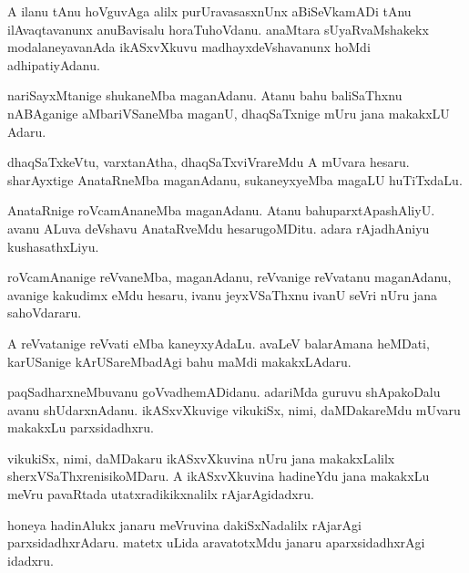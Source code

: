 \documentclass{article}
\begin{document}
\begin{mn}%
A ilanu tAnu hoVguvAga alilx purUravasasxnUnx aBiSeVkamADi tAnu
ilAvaqtavanunx anuBavisalu horaTuhoVdanu. anaMtara sUyaRvaMshakekx
modalaneyavanAda ikASxvXkuvu madhayxdeVshavanunx hoMdi adhipatiyAdanu.
\end{mn}

\begin{mn}%
nariSayxMtanige shukaneMba maganAdanu. Atanu bahu baliSaThxnu
nABAganige aMbariVSaneMba maganU, dhaqSaTxnige mUru jana makakxLU Adaru.
\end{mn}

\begin{mn}
dhaqSaTxkeVtu, varxtanAtha, dhaqSaTxviVrareMdu A mUvara
hesaru. sharAyxtige AnataRneMba maganAdanu, sukaneyxyeMba magaLU huTiTxdaLu.
\end{mn}

\begin{mn}
AnataRnige roVcamAnaneMba maganAdanu. Atanu bahuparxtApashAliyU. avanu
ALuva deVshavu AnataRveMdu hesarugoMDitu. adara rAjadhAniyu kushasathxLiyu.
\end{mn}

\begin{mn}
roVcamAnanige reVvaneMba, maganAdanu, reVvanige reVvatanu maganAdanu,
avanige kakudimx eMdu hesaru, ivanu jeyxVSaThxnu ivanU seVri nUru jana sahoVdararu.
\end{mn}

\begin{mn}%
A reVvatanige reVvati eMba kaneyxyAdaLu. avaLeV balarAmana heMDati,
karUSanige kArUSareMbadAgi bahu maMdi makakxLAdaru.
\end{mn}

\begin{mn}%
paqSadharxneMbuvanu goVvadhemADidanu. adariMda guruvu shApakoDalu
avanu shUdarxnAdanu. ikASxvXkuvige vikukiSx, nimi, daMDakareMdu mUvaru
makakxLu parxsidadhxru.
\end{mn}

\begin{mn}
vikukiSx, nimi, daMDakaru ikASxvXkuvina nUru jana makakxLalilx
sherxVSaThxrenisikoMDaru. A ikASxvXkuvina hadineYdu jana makakxLu
meVru pavaRtada utatxradikikxnalilx rAjarAgidadxru.
\end{mn}

\begin{mn}
honeya hadinAlukx janaru meVruvina dakiSxNadalilx rAjarAgi
parxsidadhxrAdaru. matetx uLida aravatotxMdu janaru aparxsidadhxrAgi idadxru.
\end{mn}
\end{document}
